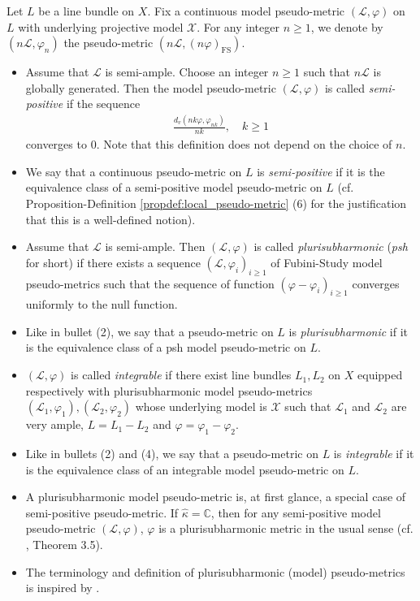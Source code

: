 \documentclass [11pt,reqno]{amsart}
\def\bC{{\mathbb{C}}}
\newcommand{\1}{\mathmybb{1}}
\def\cL{{\mathcal{L}}}
\def\cX{{\mathcal{X}}}
\begin{document}
\begin{definition}
\label{propdef:psh_local_pseudo_metric}
Let $L$ be a line bundle on $X$. Fix a continuous model pseudo-metric $(\cL,\varphi)$ on $L$ with underlying projective model $\cX$. For any integer $n\geq 1$, we denote by $(n\cL,\varphi_n)$ the pseudo-metric $(n\cL,(n\varphi)_{\mathrm{FS}})$. 

\begin{itemize}
	\item[(1)] Assume that $\cL$ is semi-ample. Choose an integer $n\geq 1$ such that $n\cL$ is globally generated. Then the model pseudo-metric $(\cL,\varphi)$ is called \emph{semi-positive} if the sequence
\begin{align*}
\frac{d_{v}(nk\varphi,\varphi_{nk})}{nk}, \quad k\geq 1
\end{align*}
converges to $0$. Note that this definition does not depend on the choice of $n$. 
	\item[(2)] We say that a continuous pseudo-metric on $L$ is \emph{semi-positive} if it is the equivalence class of a semi-positive model pseudo-metric on $L$ (cf. Proposition-Definition \ref{propdef:local_pseudo-metric} (6) for the justification that this is a well-defined notion). 
	\item[(3)] Assume that $\cL$ is semi-ample. Then $(\cL,\varphi)$ is called \emph{plurisubharmonic} (\emph{psh} for short) if there exists a sequence $(\cL,\varphi_i)_{i\geq 1}$ of Fubini-Study model pseudo-metrics such that the sequence of function $(\varphi-\varphi_{i})_{i\geq 1}$ converges uniformly to the null function. 
	\item[(4)] Like in bullet (2), we say that a pseudo-metric on $L$ is \emph{plurisubharmonic} if it is the equivalence class of a psh model pseudo-metric on $L$.
	\item[(5)] $(\cL,\varphi)$ is called \emph{integrable} if there exist line bundles $L_1,L_2$ on $X$ equipped respectively with plurisubharmonic model pseudo-metrics $(\cL_1,\varphi_1),(\cL_2,\varphi_2)$ whose underlying model is $\cX$ such that $\cL_1$ and $\cL_2$ are very ample, $L=L_1-L_2$ and $\varphi=\varphi_1-\varphi_2$.
	\item[(6)] Like in bullets (2) and (4), we say that a pseudo-metric on $L$ is \emph{integrable} if it is the equivalence class of an integrable model pseudo-metric on $L$.
\end{itemize}
\end{definition}

\begin{remark}
\label{rem:psh_semi-positive}
\begin{itemize}
	\item[(1)] A plurisubharmonic model pseudo-metric is, at first glance, a special case of semi-positive pseudo-metric. If $\widehat{\kappa}=\bC$, then for any semi-positive model pseudo-metric $(\cL,\varphi)$, $\varphi$ is a plurisubharmonic metric in the usual sense (cf. \cite{Zhang95}, Theorem 3.5). 
	\item[(2)] The terminology and definition of plurisubharmonic (model) pseudo-metrics is inspired by \cite{BoucksomEriksson}.
\end{itemize}
\end{remark}
\end{document}
